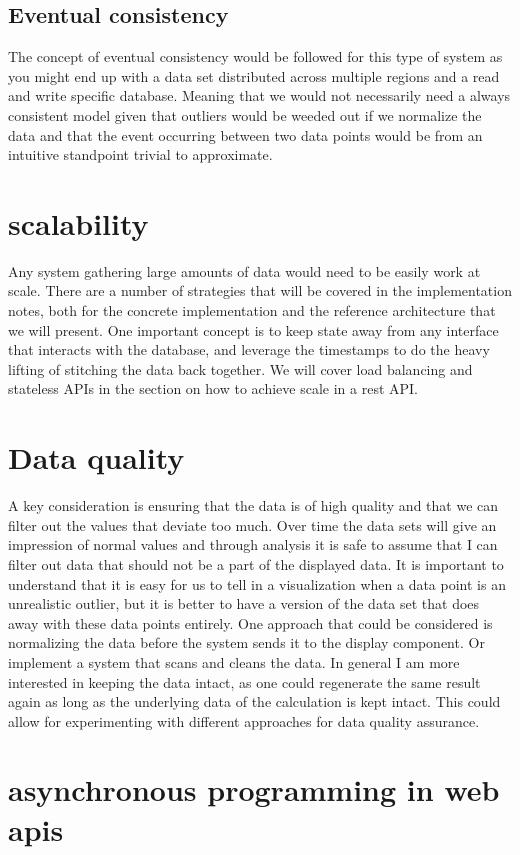 \documentclass[]{uiophd}
\begin{document}
\subsection{Eventual consistency}
The concept of eventual consistency would be followed for this type of system as you might end up with a data set distributed across multiple regions and a read and write specific database. Meaning that we would not necessarily need a always consistent model given that outliers would be weeded out if we normalize the data and that the event occurring between two data points would be from an intuitive standpoint trivial to approximate.
\section{scalability}
Any system gathering large amounts of data would need to be easily work at scale. There are a number of strategies that will be covered in the implementation notes, both for the concrete implementation and the reference architecture that we will present. One important concept is to keep state away from any interface that interacts with the database, and leverage the timestamps to do the heavy lifting of stitching the data back together. We will cover load balancing and stateless APIs in the section on how to achieve scale in a rest API.
\section{Data quality}
A key consideration is ensuring that the data is of high quality and that we can filter out the values that deviate too much. Over time the data sets will give an impression of normal values and through analysis it is safe to assume that I can filter out data that should not be a part of the displayed data. It is important to understand that it is easy for us to tell in a visualization when a data point is an unrealistic outlier, but it is better to have a version of the data set that does away with these data points entirely. One approach that could be considered is normalizing the data before the system sends it to the display component. Or implement a system that scans and cleans the data. In general I am more interested in keeping the data intact, as one could regenerate the same result again as long as the underlying data of the calculation is kept intact. This could allow for experimenting with different approaches for data quality assurance.
\section{asynchronous programming in web apis}
\end{document}
